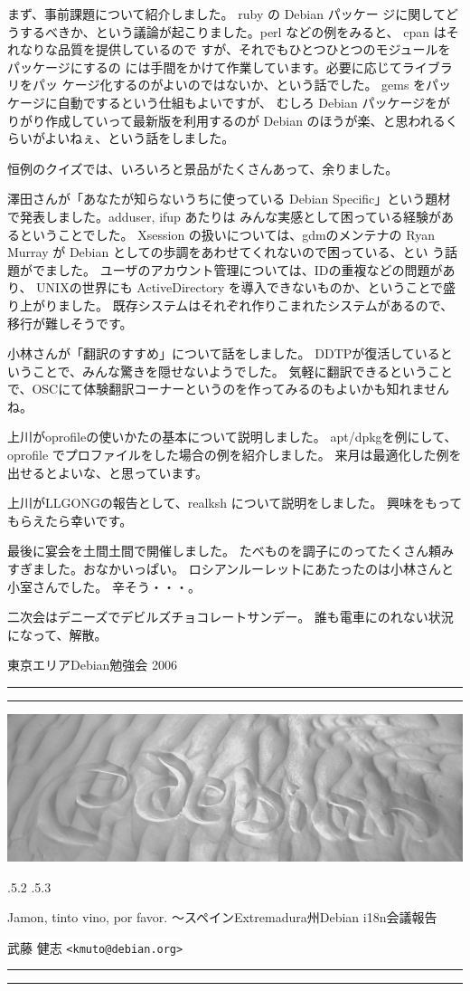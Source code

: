 \documentclass[mingoth,a4paper]{jsarticle}
\makeatletter
\renewcommand{\section}{\@startsection{section}{1}{\z@}%
    {\Cvs \@plus.5\Cdp \@minus.2\Cdp}%
    {.5\Cvs \@plus.3\Cdp}%
    {\normalfont\Huge\headfont\raggedright\centering}} %
\newcommand{\dancersection}[2]{%
\newpage
東京エリアDebian勉強会 2006
\hrule
\vspace{0.5mm}
\hrule
\hfill{}\includegraphics[width=16cm]{image2006-natsu/guruguru-sand-light.png}\\
\vspace{-5cm}
\begin{center}
\section{#1}
\end{center}
\hfill{}\colorbox{white}{#2}\hspace{3cm}\space\\
\vspace{1cm}
\hrule
\vspace{0.5mm}
\hrule
\vspace{1cm}
}
\makeatother
\begin{document}
	
	  
	    まず、事前課題について紹介しました。 ruby の Debian パッケー
	    ジに関してどうするべきか、という議論が起こりました。perl 
	    などの例をみると、 cpan はそれなりな品質を提供しているので
	    すが、それでもひとつひとつのモジュールをパッケージにするの
	    には手間をかけて作業しています。必要に応じてライブラリをパッ
	    ケージ化するのがよいのではないか、という話でした。
	    gems をパッケージに自動でするという仕組もよいですが、
	    むしろ Debian パッケージをがりがり作成していって最新版を利用するのが
	    Debian のほうが楽、と思われるくらいがよいねぇ、という話をしました。
	  
	  
	    恒例のクイズでは、いろいろと景品がたくさんあって、余りました。
	  
	  
	    澤田さんが「あなたが知らないうちに使っている Debian
	    Specific」という題材で発表しました。adduser, ifup あたりは
	    みんな実感として困っている経験があるということでした。
	    Xsession の扱いについては、gdmのメンテナの Ryan Murray が 
	    Debian としての歩調をあわせてくれないので困っている、とい
	    う話題がでました。
	    ユーザのアカウント管理については、IDの重複などの問題があり、
	    UNIXの世界にも ActiveDirectory を導入できないものか、ということで盛り上がりました。
	    既存システムはそれぞれ作りこまれたシステムがあるので、移行が難しそうです。
	  
	  
	    小林さんが「翻訳のすすめ」について話をしました。
	    DDTPが復活しているということで、みんな驚きを隠せないようでした。
	    気軽に翻訳できるということで、OSCにて体験翻訳コーナーというのを作ってみるのもよいかも知れませんね。
	  
	  
	    上川がoprofileの使いかたの基本について説明しました。
	    apt/dpkgを例にして、oprofile でプロファイルをした場合の例を紹介しました。
	    来月は最適化した例を出せるとよいな、と思っています。
	  
	  
	    上川がLLGONGの報告として、realksh について説明をしました。
	    興味をもってもらえたら幸いです。
	  
	  
	    最後に宴会を土間土間で開催しました。
	    たべものを調子にのってたくさん頼みすぎました。おなかいっぱい。
	    ロシアンルーレットにあたったのは小林さんと小室さんでした。
	    辛そう・・・。
	  
	  
	    二次会はデニーズでデビルズチョコレートサンデー。
	    誰も電車にのれない状況になって、解散。


\dancersection{Jamon, tinto vino, por favor. 〜スペインExtremadura州Debian i18n会議報告}{武藤 健志 \texttt{<kmuto@debian.org>}}
\label{sec:extremadura}
\end{document}
